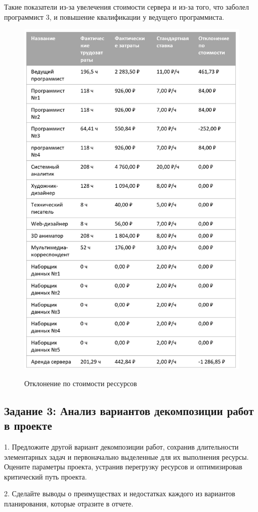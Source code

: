 Такие показатели из-за увелечения стоимости сервера и из-за того, что заболел программист 3, и повышение квалификации у ведущего программиста.

\begin{figure}[ht!]
	\includegraphics[width=0.75\linewidth]{assets/images/Screenshot 2024-03-16 at 13.02.19.png}
	\label{fig:r2}
	\caption{Отклонение по стоимости рессурсов}
\end{figure}
\FloatBarrier

\subsection{Задание 3: Анализ вариантов декомпозиции работ в проекте}

1. Предложите другой вариант декомпозиции работ, сохранив
длительности элементарных задач и первоначально выделенные для их
выполнения ресурсы. Оцените параметры проекта, устранив перегрузку
ресурсов и оптимизировав критический путь проекта.

2. Сделайте выводы о преимуществах и недостатках каждого из вариантов
планирования, которые отразите в отчете.

